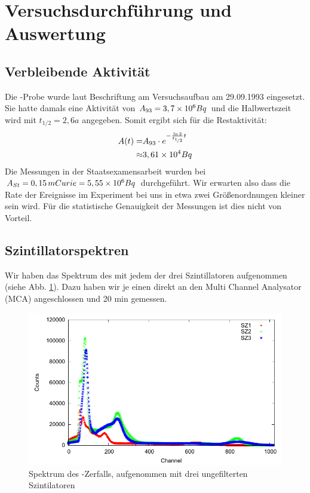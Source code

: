 \section{Versuchsdurchführung und Auswertung}

\subsection{Verbleibende Aktivität}

Die \Na-Probe wurde laut Beschriftung am Versuchsaufbau am 29.09.1993 eingesetzt. Sie hatte damals eine Aktivität von $A_{93} = 3,7\times 10^{6} Bq$ und die Halbwertszeit wird mit $t_{1/2} = 2,6 a$ angegeben. Somit ergibt sich für die Restaktivität:
\begin{eqnarray*}
 A(t) = & A_{93} \cdot e^{-\frac{\ln 2}{t_{\nicefrac{1}{2}}} t} \\
      \approx & 3,61\times 10^{4} Bq
\end{eqnarray*}
\label{verbleibende_aktivitaet}
Die Messungen in der Staatsexamensarbeit wurden bei $A_{St} = 0,15\, mCurie = 5,55\times 10^{6} Bq$ durchgeführt. Wir erwarten also dass die Rate der Ereignisse im Experiment bei uns in etwa zwei Größenordnungen kleiner sein wird. Für die statistische Genauigkeit der Messungen ist dies nicht von Vorteil.

\subsection{Szintillatorspektren}
Wir haben das Spektrum des \Na  mit jedem der drei Szintillatoren aufgenommen (siehe Abb. \ref{22na-schrottspektrum}). Dazu haben wir je einen direkt an den Multi Channel Analysator (MCA) angeschlossen und 20 min gemessen.

\begin{figure}[ht]
 \includegraphics[width=\textwidth]{Graphen/Na-Spektren/na-spektren-1.pdf}
 \caption{Spektrum des \Na-Zerfalls, aufgenommen mit drei ungefilterten Szintilatoren}
 \label{22na-schrottspektrum}
\end{figure}

